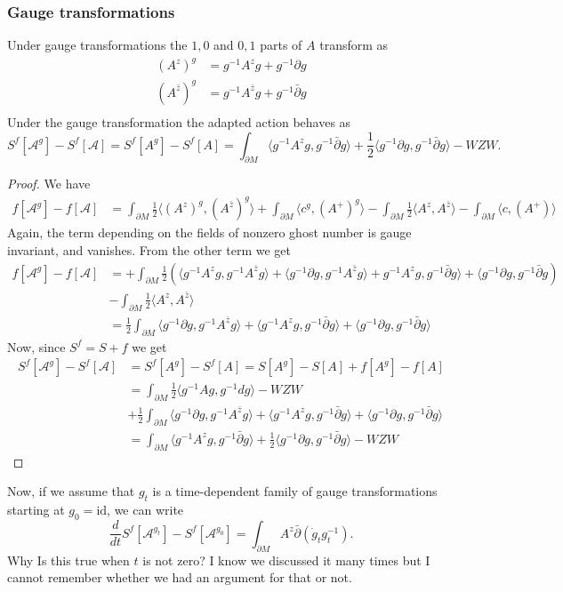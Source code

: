 \documentclass[a4paper,reqno]{amsart}
\newcommand{\calA}{\mathcal{A}}
\newcommand{\de}{\partial}
\begin{document}
\subsubsection{Gauge transformations} 
Under gauge transformations the $1,0$ and $0,1$ parts of $A$ transform as 
\begin{align*}
(A^z)^g &= g^{-1}A^zg + g^{-1}\partial g \\
(A^{\bar{z}})^g &= g^{-1}A^{\bar{z}}g + g^{-1}\bar\partial g \\
\end{align*}
Under the gauge transformation the adapted action behaves as 
$$S^f[\calA^g]-S^f[\calA] = S^f[A^g]-S^f[A] = \int_{\de M} \langle g^{-1}A^zg, g^{-1}\bar\partial g \rangle + \frac{1}{2} \langle g^{-1} \partial g, g^{-1}\bar\partial g\rangle - WZW.$$
\begin{proof}
We have 
\begin{align*}
 f[\calA^g] - f[\calA] &= \int_{\de M} \frac{1}{2}\langle (A^z)^g,(A^{\bar{z}})^g\rangle + \int_{\de M} \langle c^g,(A^+)^g \rangle  - \int_{\de M} \frac{1}{2}\langle A^z,A^{\bar{z}} \rangle - \int_{\de M} \langle c,(A^+) \rangle
\end{align*}
Again, the term depending on the fields of nonzero ghost number is gauge invariant, and vanishes. From the other term we get 
\begin{align*} f[\calA^g] - f[\calA] &= +\int_{\de M} \frac{1}{2}\left( \langle g^{-1}A^zg, g^{-1}A^{\bar{z}}g\rangle +  \langle g^{-1}\partial g, g^{-1}A^{\bar{z}}g\rangle + g^{-1}A^zg, g^{-1}\bar\partial g \rangle + \langle g^{-1} \partial g, g^{-1}\bar\partial g \right) \\
 &- \int_{\de M} \frac{1}{2}\langle A^z,A^{\bar{z}} \rangle \\ 
 &=   \frac{1}{2}\int_{\de M} \langle g^{-1}\partial g, g^{-1}A^{\bar{z}}g\rangle + \langle g^{-1}A^zg, g^{-1}\bar\partial g \rangle + \langle g^{-1} \partial g, g^{-1}\bar\partial g\rangle   
\end{align*} 
Now, since $S^f = S + f$ we get 
\begin{align*}
S^f[\calA^g]-S^f[\calA] &= S^f[A^g]-S^f[A] = S[A^g]- S[A] + f[A^g]-f[A] \\
&= \int_{\de M} \frac{1}{2}\langle g^{-1}Ag, g^{-1}dg \rangle - WZW  \\ 
&+ \frac{1}{2}\int_{\de M} \langle g^{-1}\partial g, g^{-1}A^{\bar{z}}g\rangle + \langle g^{-1}A^zg, g^{-1}\bar\partial g \rangle + \langle g^{-1} \partial g, g^{-1}\bar\partial g\rangle  \\ 
&= \int_{\de M} \langle g^{-1}A^zg, g^{-1}\bar\partial g \rangle + \frac{1}{2} \langle g^{-1} \partial g, g^{-1}\bar\partial g\rangle - WZW
\end{align*}
\end{proof}
Now, if we assume that $g_t$ is a time-dependent family of gauge transformations starting at $g_0 = \mathrm{id}$, we can write 
$$\frac{d}{dt} S^f[\calA^{g_t}] - S^f[\calA^{g_0}] = \int_{\de M} A^z\bar\de(\dot{g}_tg_t^{-1}).$$
{\color{red}Why Is this true when $t$ is not zero? I know we discussed it many times but I cannot remember whether we had an argument for that or not.}
\end{document}
